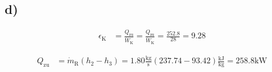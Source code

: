 

\subsection*{d)}

\begin{align*}
\epsilon_{\text{K}} &= \frac{Q_{\text{zu}}}{\dot{W}_{\text{K}}} = \frac{Q_{\text{zu}}}{\dot{W}_{\text{K}}} = \frac{252.8}{28} = 9.28
\end{align*}

\begin{align*}
Q_{\text{zu}} &= \dot{m}_{\text{R}} (h_2 - h_3) = 1.80 \frac{\text{kg}}{\text{s}} (237.74 - 93.42) \frac{\text{kJ}}{\text{kg}} = 258.8 \text{kW}
\end{align*}